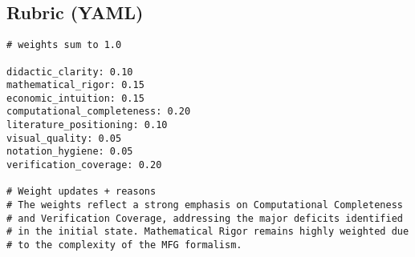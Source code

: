 ﻿\documentclass[11pt,letterpaper,oneside]{article}
\numberwithin{equation}{section}
\newcommand{\1}{\mathbf{1}}
\begin{document}
\subsection*{Rubric (YAML)}
\begin{tcolorbox}[sympycheckstyle,title={Replication Rubric (YAML)}]
\begin{Verbatim}[fontsize=\small]
# weights sum to 1.0

didactic_clarity: 0.10
mathematical_rigor: 0.15
economic_intuition: 0.15
computational_completeness: 0.20
literature_positioning: 0.10
visual_quality: 0.05
notation_hygiene: 0.05
verification_coverage: 0.20

# Weight updates + reasons
# The weights reflect a strong emphasis on Computational Completeness
# and Verification Coverage, addressing the major deficits identified
# in the initial state. Mathematical Rigor remains highly weighted due
# to the complexity of the MFG formalism.
\end{Verbatim}
\end{tcolorbox}
\end{document}
